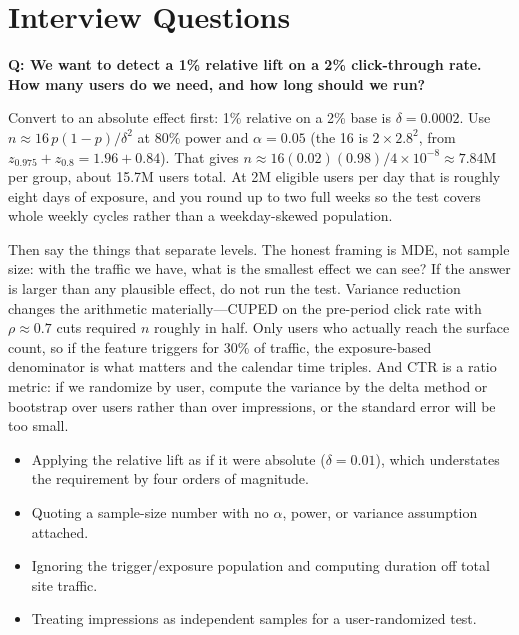 \section{Interview Questions}
\label{cml:sec:experimentation_interview}

\begin{interviewq}
\textbf{Q: We want to detect a 1\% relative lift on a 2\% click-through rate. How many users do we need, and how long should we run?}

 \quad {} \quad \badgefreq{\freqhigh}

\stronganswer

Convert to an absolute effect first: 1\% relative on a 2\% base is $\delta = 0.0002$. Use $n \approx 16\,p(1-p)/\delta^2$ at 80\% power and $\alpha = 0.05$ (the 16 is $2 \times 2.8^2$, from $z_{0.975} + z_{0.8} = 1.96 + 0.84$). That gives $n \approx 16(0.02)(0.98)/4\times10^{-8} \approx 7.84$M per group, about 15.7M users total. At 2M eligible users per day that is roughly eight days of exposure, and you round up to two full weeks so the test covers whole weekly cycles rather than a weekday-skewed population.

Then say the things that separate levels. The honest framing is MDE, not sample size: with the traffic we have, what is the smallest effect we can see? If the answer is larger than any plausible effect, do not run the test. Variance reduction changes the arithmetic materially---CUPED on the pre-period click rate with $\rho \approx 0.7$ cuts required $n$ roughly in half. Only users who actually reach the surface count, so if the feature triggers for 30\% of traffic, the exposure-based denominator is what matters and the calendar time triples. And CTR is a ratio metric: if we randomize by user, compute the variance by the delta method or bootstrap over users rather than over impressions, or the standard error will be too small.

\redflags
\begin{itemize}
    \item Applying the relative lift as if it were absolute ($\delta = 0.01$), which understates the requirement by four orders of magnitude.
    \item Quoting a sample-size number with no $\alpha$, power, or variance assumption attached.
    \item Ignoring the trigger/exposure population and computing duration off total site traffic.
    \item Treating impressions as independent samples for a user-randomized test.
\end{itemize}


\end{interviewq}
